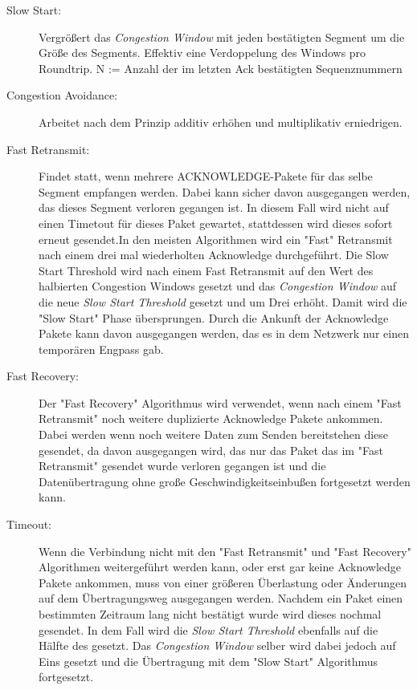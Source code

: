 \begin{description}
\item[Slow Start: ] Vergrößert das \textit{Congestion Window} mit jeden bestätigten Segment um die Größe des Segments. Effektiv eine Verdoppelung des Windows pro Roundtrip.
N := Anzahl der im letzten Ack bestätigten Sequenznummern
\item[Congestion Avoidance:] Arbeitet nach dem Prinzip additiv erhöhen und multiplikativ erniedrigen. 
\item[Fast Retransmit:] Findet statt, wenn mehrere ACKNOWLEDGE-Pakete für das selbe Segment empfangen werden. Dabei kann sicher davon ausgegangen werden, das dieses Segment verloren gegangen ist. In diesem Fall wird nicht auf einen Timetout für dieses Paket gewartet, stattdessen wird dieses sofort erneut gesendet.In den meisten Algorithmen wird ein {}"Fast"{} Retransmit nach einem drei mal wiederholten Acknowledge durchgeführt. Die Slow Start Threshold wird nach einem Fast Retransmit auf den Wert des halbierten Congestion Windows gesetzt und das \textit{Congestion Window} auf die neue \textit{Slow Start Threshold} gesetzt und um Drei erhöht. Damit wird die {}"Slow Start"{} Phase übersprungen. Durch die Ankunft der Acknowledge Pakete kann davon ausgegangen werden, das es in dem Netzwerk nur einen temporären Engpass gab. 
\item[Fast Recovery:] Der {}"Fast Recovery"{} Algorithmus wird verwendet, wenn nach einem {}"Fast Retransmit"{} noch weitere duplizierte Acknowledge Pakete ankommen. Dabei werden wenn noch weitere Daten zum Senden bereitstehen diese gesendet, da davon ausgegangen wird, das nur das Paket das im {}"Fast Retransmit"{} gesendet wurde verloren gegangen ist und die Datenübertragung ohne große Geschwindigkeitseinbußen fortgesetzt werden kann. 

\item[Timeout:] Wenn die Verbindung nicht mit den {}"Fast Retransmit{}" und {}"Fast Recovery{}" Algorithmen weitergeführt werden kann, oder erst gar keine Acknowledge Pakete ankommen, muss von einer größeren Überlastung oder Änderungen auf dem Übertragungsweg ausgegangen werden. Nachdem ein Paket einen bestimmten Zeitraum lang nicht bestätigt wurde wird dieses nochmal gesendet. In dem Fall wird die \textit{Slow Start Threshold} ebenfalls auf die Hälfte des gesetzt. Das \textit{Congestion Window} selber wird dabei jedoch auf Eins gesetzt und die Übertragung mit dem {}"Slow Start{}" Algorithmus fortgesetzt. 
\end{description}

